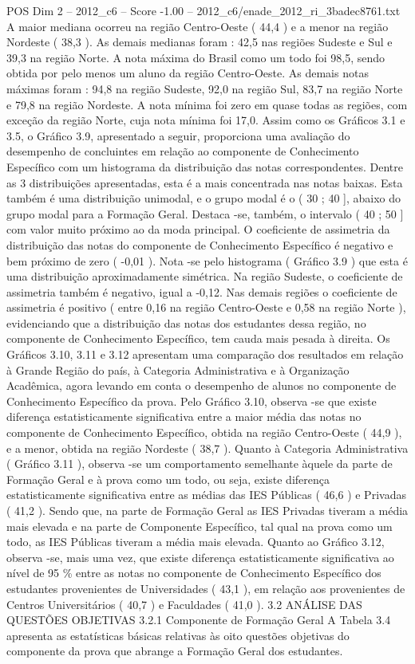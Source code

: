 \begin{textsample}{POS Dim 2 – 2012\_c6 – Score -1.00 – 2012\_c6/enade\_2012\_ri\_3badec8761.txt}
A maior mediana ocorreu na região Centro-Oeste ( 44,4 ) e a menor na região Nordeste ( 38,3 ).
As demais medianas foram : 42,5 nas regiões Sudeste e Sul e 39,3 na região Norte.
A nota máxima do Brasil como um todo foi 98,5, sendo obtida por pelo menos um aluno da região Centro-Oeste.
As demais notas máximas foram : 94,8 na região Sudeste, 92,0 na região Sul, 83,7 na região Norte e 79,8 na região Nordeste.
A nota mínima foi zero em quase todas as regiões, com exceção da região Norte, cuja nota mínima foi 17,0.
Assim como os Gráficos 3.1 e 3.5, o Gráfico 3.9, apresentado a seguir, proporciona uma avaliação do desempenho de concluintes em relação ao componente de Conhecimento Específico com um histograma da distribuição das notas correspondentes.
Dentre as 3 distribuições apresentadas, esta é a mais concentrada nas notas baixas.
Esta também é uma distribuição unimodal, e o grupo modal é o ( 30 ; 40 ], abaixo do grupo modal para a Formação Geral.
Destaca -se, também, o intervalo ( 40 ; 50 ] com valor muito próximo ao da moda principal.
O coeficiente de assimetria da distribuição das notas do componente de Conhecimento Específico é negativo e bem próximo de zero ( -0,01 ).
Nota -se pelo histograma ( Gráfico 3.9 ) que esta é uma distribuição aproximadamente simétrica.
Na região Sudeste, o coeficiente de assimetria também é negativo, igual a -0,12.
Nas demais regiões o coeficiente de assimetria é positivo ( entre 0,16 na região Centro-Oeste e 0,58 na região Norte ), evidenciando que a distribuição das notas dos estudantes dessa região, no componente de Conhecimento Específico, tem cauda mais pesada à direita.
Os Gráficos 3.10, 3.11 e 3.12 apresentam uma comparação dos resultados em relação à Grande Região do país, à Categoria Administrativa e à Organização Acadêmica, agora levando em conta o desempenho de alunos no componente de Conhecimento Específico da prova.
Pelo Gráfico 3.10, observa -se que existe diferença estatisticamente significativa entre a maior média das notas no componente de Conhecimento Específico, obtida na região Centro-Oeste ( 44,9 ), e a menor, obtida na região Nordeste ( 38,7 ).
Quanto à Categoria Administrativa ( Gráfico 3.11 ), observa -se um comportamento semelhante àquele da parte de Formação Geral e à prova como um todo, ou seja, existe diferença estatisticamente significativa entre as médias das IES Públicas ( 46,6 ) e Privadas ( 41,2 ).
Sendo que, na parte de Formação Geral as IES Privadas tiveram a média mais elevada e na parte de Componente Específico, tal qual na prova como um todo, as IES Públicas tiveram a média mais elevada.
Quanto ao Gráfico 3.12, observa -se, mais uma vez, que existe diferença estatisticamente significativa ao nível de 95 \% entre as notas no componente de Conhecimento Específico dos estudantes provenientes de Universidades ( 43,1 ), em relação aos provenientes de Centros Universitários ( 40,7 ) e Faculdades ( 41,0 ). 3.2 ANÁLISE DAS QUESTÕES OBJETIVAS 3.2.1 Componente de Formação Geral A Tabela 3.4 apresenta as estatísticas básicas relativas às oito questões objetivas do componente da prova que abrange a Formação Geral dos estudantes.

\end{textsample}
